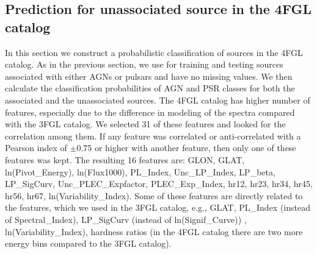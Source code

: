 \begin{table}[!h]
    \vspace{0.2cm}
    \caption{Expected number of AGNs and pulsars among the unassociated 3FGL sources.
    ``AGNs'' and ``Pulsars'' columns show the number of sources where all four algorithms predict the same class,
    ``Mixed'' column shows the number of sources with mixed classification.
    Uncorrected (corrected) rows show the number of predicted AGNs and pulsars among the unassociated sources, which are
    uncorrected (corrected) for the presence of sources other than AGNs and pulsars among the unassociated sources.}
    \label{tab:3FGL_prediction}
\end{table}



\subsection{Prediction for unassociated source in the 4FGL catalog}

In this section we construct a probabilistic classification of sources in the 4FGL catalog.
As in the previous section, we use for training and testing sources associated with either AGNs or pulsars and have no missing values.
We then calculate the classification probabilities of AGN and PSR classes for both the associated and the unassociated sources.
The 4FGL catalog has higher number of features, especially due to the difference in modeling of the spectra compared with the 3FGL catalog. 
We selected 31 of these features and looked for the correlation among them. If any feature was correlated or anti-correlated with a Pearson index of $\pm$0.75 or higher with another feature, then only one of these features was kept. 
The resulting 16 features are:
GLON, GLAT, ln(Pivot\_Energy), ln(Flux1000), PL\_Index, Unc\_LP\_Index, LP\_beta, LP\_SigCurv, Unc\_PLEC\_Expfactor, PLEC\_Exp\_Index, hr12, hr23, hr34, hr45, hr56, hr67, ln(Variability\_Index).
Some of these features are directly related to the features, which we used in the 3FGL catalog,
e.g., GLAT, PL\_Index (instead of Spectral\_Index), LP\_SigCurv (instead of ln(Signif\_Curve)) 
, 
ln(Variability\_Index), hardness ratios (in the 4FGL catalog there are two more energy bins compared to the 3FGL catalog).

